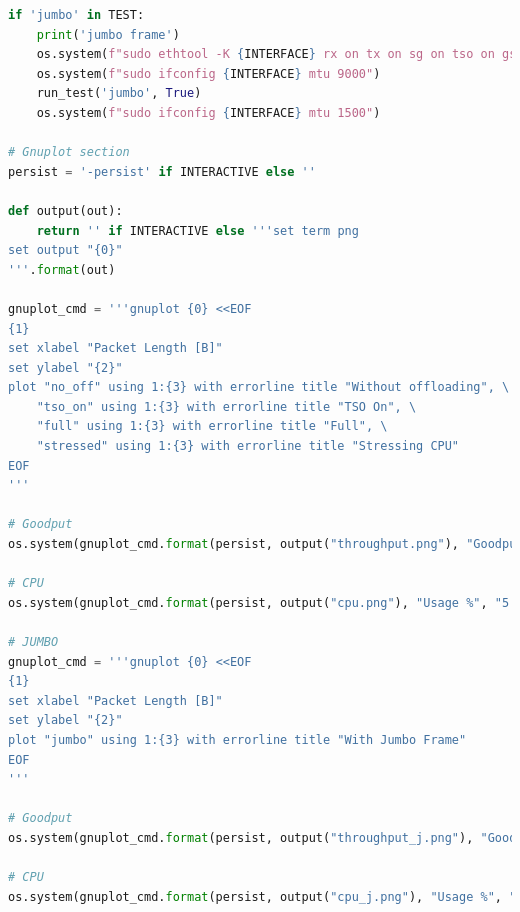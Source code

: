 \documentclass{exam}
\begin{document}
\begin{lstlisting}[language=python]
if 'jumbo' in TEST:
    print('jumbo frame')
    os.system(f"sudo ethtool -K {INTERFACE} rx on tx on sg on tso on gso on gro on")
    os.system(f"sudo ifconfig {INTERFACE} mtu 9000")
    run_test('jumbo', True)
    os.system(f"sudo ifconfig {INTERFACE} mtu 1500")

# Gnuplot section
persist = '-persist' if INTERACTIVE else ''

def output(out): 
    return '' if INTERACTIVE else '''set term png
set output "{0}"
'''.format(out)

gnuplot_cmd = '''gnuplot {0} <<EOF
{1}
set xlabel "Packet Length [B]"
set ylabel "{2}"
plot "no_off" using 1:{3} with errorline title "Without offloading", \
    "tso_on" using 1:{3} with errorline title "TSO On", \
    "full" using 1:{3} with errorline title "Full", \
    "stressed" using 1:{3} with errorline title "Stressing CPU"
EOF
'''

# Goodput
os.system(gnuplot_cmd.format(persist, output("throughput.png"), "Goodput [Gb/s]", "2:3:4"))

# CPU
os.system(gnuplot_cmd.format(persist, output("cpu.png"), "Usage %", "5:6:7"))

# JUMBO
gnuplot_cmd = '''gnuplot {0} <<EOF
{1}
set xlabel "Packet Length [B]"
set ylabel "{2}"
plot "jumbo" using 1:{3} with errorline title "With Jumbo Frame"
EOF
'''

# Goodput
os.system(gnuplot_cmd.format(persist, output("throughput_j.png"), "Goodput [Gb/s]", "2:3:4"))

# CPU
os.system(gnuplot_cmd.format(persist, output("cpu_j.png"), "Usage %", "5:6:7"))

\end{lstlisting}
\end{document}
